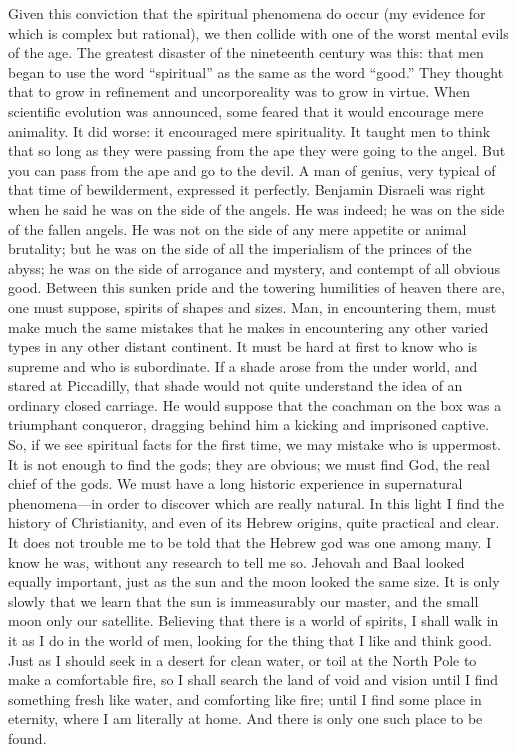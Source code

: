 Given this conviction that the spiritual phenomena do occur (my evidence for which is complex but rational), we then collide with one of the worst mental evils of the age. The greatest disaster of the nineteenth century was this: that men began to use the word “spiritual” as the same as the word “good.” They thought that to grow in refinement and uncorporeality was to grow in virtue. When scientific evolution was announced, some feared that it would encourage mere animality. It did worse: it encouraged mere spirituality. It taught men to think that so long as they were passing from the ape they were going to the angel. But you can pass from the ape and go to the devil. A man of genius, very typical of that time of bewilderment, expressed it perfectly. Benjamin Disraeli was right when he said he was on the side of the angels. He was indeed; he was on the side of the fallen angels. He was not on the side of any mere appetite or animal brutality; but he was on the side of all the imperialism of the princes of the abyss; he was on the side of arrogance and mystery, and contempt of all obvious good. Between this sunken pride and the towering humilities of heaven there are, one must suppose, spirits of shapes and sizes. Man, in encountering them, must make much the same mistakes that he makes in encountering any other varied types in any other distant continent. It must be hard at first to know who is supreme and who is subordinate. If a shade arose from the under world, and stared at Piccadilly, that shade would not quite understand the idea of an ordinary closed carriage. He would suppose that the coachman on the box was a triumphant conqueror, dragging behind him a kicking and imprisoned captive. So, if we see spiritual facts for the first time, we may mistake who is uppermost. It is not enough to find the gods; they are obvious; we must find God, the real chief of the gods. We must have a long historic experience in supernatural phenomena—in order to discover which are really natural. In this light I find the history of Christianity, and even of its Hebrew origins, quite practical and clear. It does not trouble me to be told that the Hebrew god was one among many. I know he was, without any research to tell me so. Jehovah and Baal looked equally important, just as the sun and the moon looked the same size. It is only slowly that we learn that the sun is immeasurably our master, and the small moon only our satellite. Believing that there is a world of spirits, I shall walk in it as I do in the world of men, looking for the thing that I like and think good. Just as I should seek in a desert for clean water, or toil at the North Pole to make a comfortable fire, so I shall search the land of void and vision until I find something fresh like water, and comforting like fire; until I find some place in eternity, where I am literally at home. And there is only one such place to be found.

